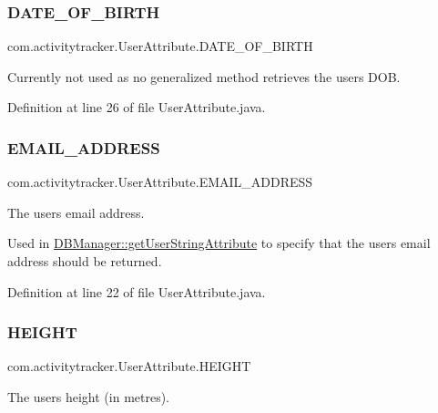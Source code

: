 \subsubsection{\texorpdfstring{DATE\_OF\_BIRTH}{DATE\_OF\_BIRTH}}
{\footnotesize\ttfamily com.\+activitytracker.\+User\+Attribute.\+D\+A\+T\+E\+\_\+\+O\+F\+\_\+\+B\+I\+R\+TH}

Currently not used as no generalized method retrieves the user\textquotesingle{}s D\+OB. 

Definition at line 26 of file User\+Attribute.\+java.

\mbox{\label{enumcom_1_1activitytracker_1_1_user_attribute_a8b9fa2ebf911262dfa24c683ff2a3b9c}} 
\subsubsection{\texorpdfstring{EMAIL\_ADDRESS}{EMAIL\_ADDRESS}}
{\footnotesize\ttfamily com.\+activitytracker.\+User\+Attribute.\+E\+M\+A\+I\+L\+\_\+\+A\+D\+D\+R\+E\+SS}

The user\textquotesingle{}s email address.

Used in \mbox{\hyperlink{classcom_1_1activitytracker_1_1_d_b_manager_a20f726c054d6c8a6fc3ce629d87f1114}{D\+B\+Manager\+::get\+User\+String\+Attribute}} to specify that the user\textquotesingle{}s email address should be returned. 

Definition at line 22 of file User\+Attribute.\+java.

\mbox{\label{enumcom_1_1activitytracker_1_1_user_attribute_a0a80ca5cce8eb4494c2128bd4291a5b7}} 
\subsubsection{\texorpdfstring{HEIGHT}{HEIGHT}}
{\footnotesize\ttfamily com.\+activitytracker.\+User\+Attribute.\+H\+E\+I\+G\+HT}

The user\textquotesingle{}s height (in metres).

